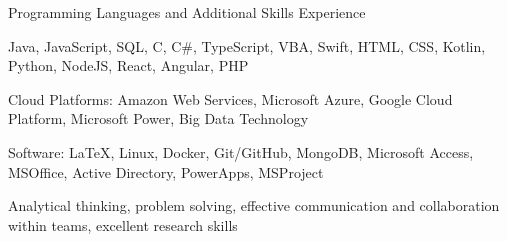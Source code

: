 \begin{cventries}
  \cventry
    {Programming Languages and Additional Skills Experience}
    { }
    { }
    { }
    {
      \begin{cvitems}
        \item {Java, JavaScript, SQL, C, C\#, TypeScript, VBA, Swift, HTML, CSS, Kotlin, Python, NodeJS, React, Angular, PHP}
        \item {Cloud Platforms: Amazon Web Services, Microsoft Azure, Google Cloud Platform, Microsoft Power, Big Data Technology}
        \item {Software: LaTeX, Linux, Docker, Git/GitHub, MongoDB, Microsoft Access, MSOffice, Active Directory, PowerApps, MSProject}
        \item {Analytical thinking, problem solving, effective communication and collaboration within teams, excellent research skills}
      \end{cvitems}
    }
\end{cventries}
